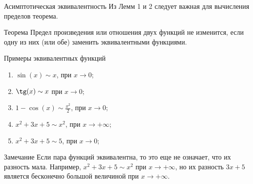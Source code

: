 \documentclass[8pt]{beamer}
\begin{document}

\begin{frame}{Асимптотическая эквивалентность}
Из Лемм 1 и 2 следует важная для вычисления пределов теорема.
\begin{block}{Теорема}
Предел произведения или отношения двух функций не изменится, если одну из них (или обе) заменить эквивалентными функциями.
\end{block}
\begin{block}{Примеры эквивалентных функций}
\begin{enumerate}
\item $\sin(x)\sim x$, при $x\to0$;
\item $\tg(x)\sim x$ при $x\to0$;
\item $\displaystyle 1-\cos(x)\sim \frac{x^2}{2}$, при $x\to0$;
\item $x^2+3x+5\sim x^2$, при $x\to+\infty$;
\item $x^2+3x+5\sim 5$, при $x\to0$;
\end{enumerate}
\end{block}
\begin{block}{Замечание}
Если пара функций эквивалентна, то это еще не означает, что их разность мала. Например, $x^2+3x+5\sim x^2$ при $x\to+\infty$, но их разность $3x+5$ является бесконечно большой величиной при $x\to+\infty$.
\end{block}
\end{frame}
\end{document}
